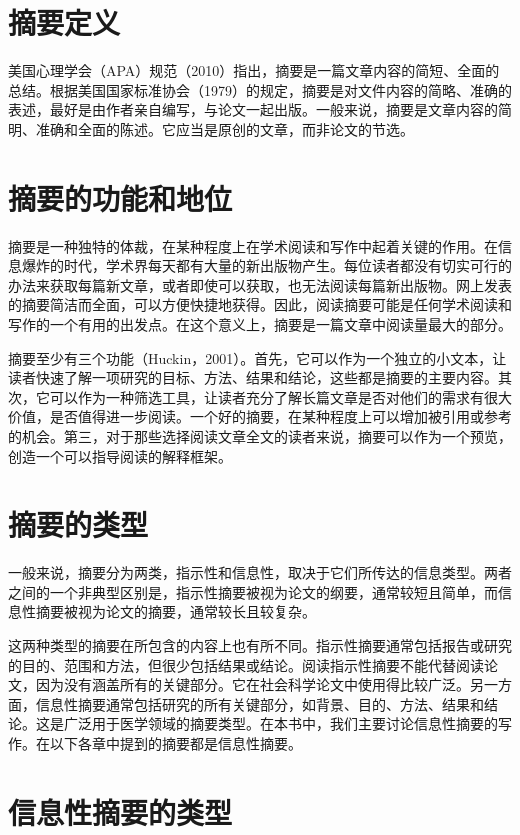 \documentclass[a4paper]{ctexbook}
\begin{document}
\section{摘要定义}

美国心理学会（APA）规范（2010）指出，摘要是一篇文章内容的简短、全面的总结。根据美国国家标准协会（1979）的规定，摘要是对文件内容的简略、准确的表述，最好是由作者亲自编写，与论文一起出版。一般来说，摘要是文章内容的简明、准确和全面的陈述。它应当是原创的文章，而非论文的节选。

\section{摘要的功能和地位}

摘要是一种独特的体裁，在某种程度上在学术阅读和写作中起着关键的作用。在信息爆炸的时代，学术界每天都有大量的新出版物产生。每位读者都没有切实可行的办法来获取每篇新文章，或者即使可以获取，也无法阅读每篇新出版物。网上发表的摘要简洁而全面，可以方便快捷地获得。因此，阅读摘要可能是任何学术阅读和写作的一个有用的出发点。在这个意义上，摘要是一篇文章中阅读量最大的部分。

摘要至少有三个功能（Huckin，2001）。首先，它可以作为一个独立的小文本，让读者快速了解一项研究的目标、方法、结果和结论，这些都是摘要的主要内容。其次，它可以作为一种筛选工具，让读者充分了解长篇文章是否对他们的需求有很大价值，是否值得进一步阅读。一个好的摘要，在某种程度上可以增加被引用或参考的机会。第三，对于那些选择阅读文章全文的读者来说，摘要可以作为一个预览，创造一个可以指导阅读的解释框架。


\section{摘要的类型}

一般来说，摘要分为两类，指示性和信息性，取决于它们所传达的信息类型。两者之间的一个非典型区别是，指示性摘要被视为论文的纲要，通常较短且简单，而信息性摘要被视为论文的摘要，通常较长且较复杂。

这两种类型的摘要在所包含的内容上也有所不同。指示性摘要通常包括报告或研究的目的、范围和方法，但很少包括结果或结论。阅读指示性摘要不能代替阅读论文，因为没有涵盖所有的关键部分。它在社会科学论文中使用得比较广泛。另一方面，信息性摘要通常包括研究的所有关键部分，如背景、目的、方法、结果和结论。这是广泛用于医学领域的摘要类型。在本书中，我们主要讨论信息性摘要的写作。在以下各章中提到的摘要都是信息性摘要。


\section{信息性摘要的类型}
\end{document}
